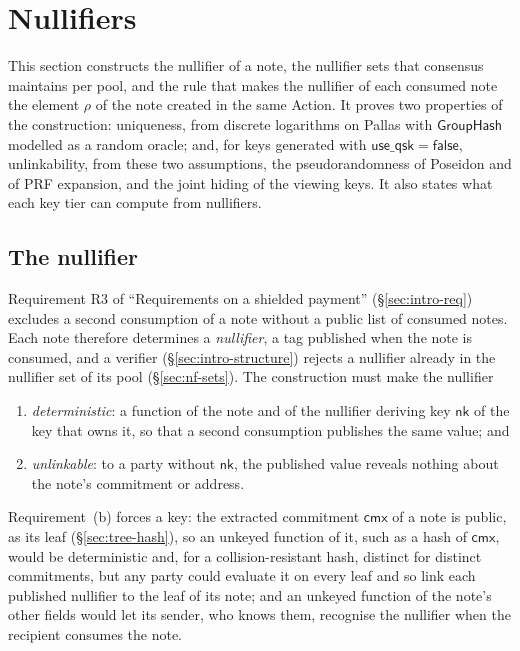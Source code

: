 \documentclass[11pt,a4paper]{article}
\theoremstyle{definition}
\newcommand{\cmx}{\mathsf{cmx}}
\newcommand{\GroupHash}{\ensuremath{\mathsf{GroupHash}}}
\newcommand{\nksym}{\ensuremath{\mathsf{nk}}}
\begin{document}
\section{Nullifiers}\label{sec:nf}

This section constructs the nullifier of a note, the nullifier sets that
consensus maintains per pool, and the rule that makes the nullifier of each
consumed note the element $\rho$ of the note created in the same Action. It
proves two properties of the construction: uniqueness, from discrete
logarithms on Pallas with $\GroupHash$ modelled as a random oracle; and, for
keys generated with $\mathsf{use\_qsk} = \mathsf{false}$, unlinkability, from
these two assumptions, the pseudorandomness of Poseidon and of PRF expansion,
and the joint hiding of the viewing keys. It also states what each key tier
can compute from nullifiers.

\subsection{The nullifier}\label{sec:nf-nullifier}

Requirement R3 of ``Requirements on a shielded payment''
(\S\ref{sec:intro-req}) excludes a second consumption of a note without a
public list of consumed notes. Each note therefore determines a
\emph{nullifier}, a tag published when the note is consumed, and a verifier
(\S\ref{sec:intro-structure}) rejects a nullifier already in the nullifier
set of its pool (\S\ref{sec:nf-sets}). The construction must make the nullifier
\begin{enumerate}
\item[(a)] \emph{deterministic}: a function of the note and of the nullifier
  deriving key $\nksym$ of the key that owns it, so that a second
  consumption publishes the same value; and
\item[(b)] \emph{unlinkable}: to a party without $\nksym$, the published
  value reveals nothing about the note's commitment or address.
\end{enumerate}
Requirement~(b) forces a key: the extracted commitment $\cmx$ of a note is
public, as its leaf (\S\ref{sec:tree-hash}), so an unkeyed function of it,
such as a hash of $\cmx$, would be deterministic and, for a
collision-resistant hash, distinct for distinct commitments, but any party
could evaluate it on every leaf and so link each published nullifier to the
leaf of its note; and an unkeyed function of the note's other fields would
let its sender, who knows them, recognise the nullifier when the recipient
consumes the note.
\end{document}
